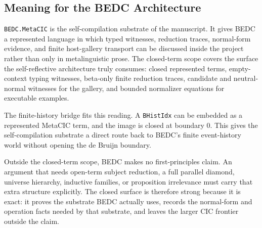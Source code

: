 \subsection{Meaning for the BEDC Architecture}
\label{subsec:closed-term-broader-architecture}

\texttt{BEDC.MetaCIC} is the self-compilation substrate of the manuscript.  It
gives BEDC a represented language in which typed witnesses, reduction traces,
normal-form evidence, and finite host-gallery transport can be discussed
inside the project rather than only in metalinguistic prose.  The closed-term
scope covers the surface the self-reflective architecture truly consumes:
closed represented terms, empty-context typing witnesses, beta-only finite
reduction traces, candidate and neutral-normal witnesses for the gallery, and
bounded normalizer equations for executable examples.

The finite-history bridge fits this reading.  A \texttt{BHistIdx} can be
embedded as a represented MetaCIC term, and the image is closed at boundary
$0$.  This gives the self-compilation substrate a direct route back to BEDC's
finite event-history world without opening the de Bruijn boundary.


Outside the closed-term scope, BEDC makes no first-principles claim.  An
argument that needs open-term subject reduction, a full parallel diamond,
universe hierarchy, inductive families, or proposition irrelevance must carry
that extra structure explicitly.  The closed surface is therefore strong
because it is exact: it proves the substrate BEDC actually uses, records the
normal-form and operation facts needed by that substrate, and leaves the
larger CIC frontier outside the claim.
